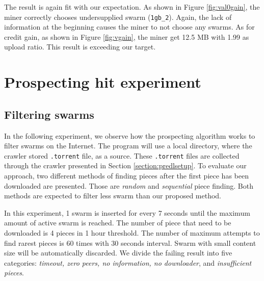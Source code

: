 The result is again fit with our expectation. As shown in Figure \ref{fig:val0gain}, the miner correctly chooses undersupplied swarm (\texttt{1gb\_2}). Again, the lack of information at the beginning causes the miner to not choose any swarms. As for credit gain, as shown in Figure \ref{fig:vgain}, the miner get 12.5 MB with 1.99 as upload ratio. This result is exceeding our target. 

\section{Prospecting hit experiment}
\label{section:prospectexp}


\subsection{Filtering swarms}
In the following experiment, we observe how the prospecting algorithm works to filter swarms on the Internet. The program will use a local directory, where the crawler stored \texttt{.torrent} file, as a source. These \texttt{.torrent} files are collected through the crawler presented in Section \ref{section:predlsetup}. To evaluate our approach, two different methods of finding pieces after the first piece has been downloaded are presented. Those are \textit{random} and \textit{sequential} piece finding. Both methods are expected to filter less swarm than our proposed method.


In this experiment, 1 swarm is inserted for every 7 seconds until the maximum amount of active swarm is reached. The number of piece that need to be downloaded is 4 pieces in 1 hour threshold. The number of maximum attempts to find rarest pieces is 60 times with 30 seconds interval. Swarm with small content size will be automatically discarded. We divide the failing result into five categories: \textit{timeout, zero peers, no information, no downloader}, and \textit{insufficient pieces}.

